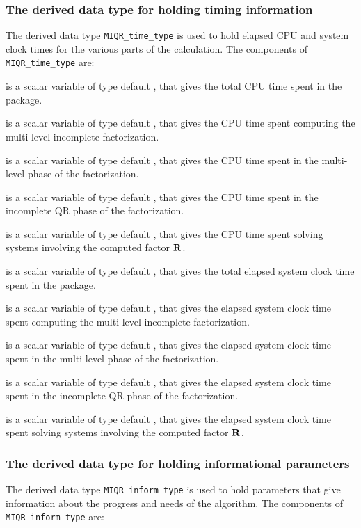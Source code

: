 \documentclass{galahad}
\newcommand{\packagename}{MIQR}
\begin{document}
\subsubsection{The derived data type for holding timing 
 information}\label{typetime}
The derived data type 
{\tt \packagename\_time\_type} 
is used to hold elapsed CPU and system clock times for the various parts of 
the calculation. The components of 
{\tt \packagename\_time\_type} 
are:
\begin{description}
 is a scalar variable of type default \realdp, that gives
 the total CPU time spent in the package.

 is a scalar variable of type default \realdp, that gives
 the CPU time spent computing the multi-level incomplete factorization.

 is a scalar variable of type default \realdp, that gives
 the CPU time spent in the multi-level phase of the factorization.

 is a scalar variable of type default \realdp, that gives
 the CPU time spent in the incomplete QR phase of the factorization.

 is a scalar variable of type default \realdp, that gives
 the CPU time spent  solving systems involving the computed factor ${\mathbf{R}}$.

 is a scalar variable of type default \realdp, that gives
 the total elapsed system clock time spent in the package.

 is a scalar variable of type default \realdp, that gives
 the elapsed system clock time spent computing the multi-level incomplete 
factorization.

 is a scalar variable of type default \realdp, that gives
 the elapsed system clock time spent in the multi-level phase of the 
factorization.

 is a scalar variable of type default \realdp, that gives
the elapsed system clock time spent in the incomplete QR phase of the 
factorization.

 is a scalar variable of type default \realdp, that gives
 the elapsed system clock time spent solving systems involving the computed 
factor ${\mathbf{R}}$.

\end{description}



\subsubsection{The derived data type for holding informational
 parameters}\label{typeinform}
The derived data type 
{\tt \packagename\_inform\_type} 
is used to hold parameters that give information about the progress and needs 
of the algorithm. The components of 
{\tt \packagename\_inform\_type} 
are:
\end{document}
